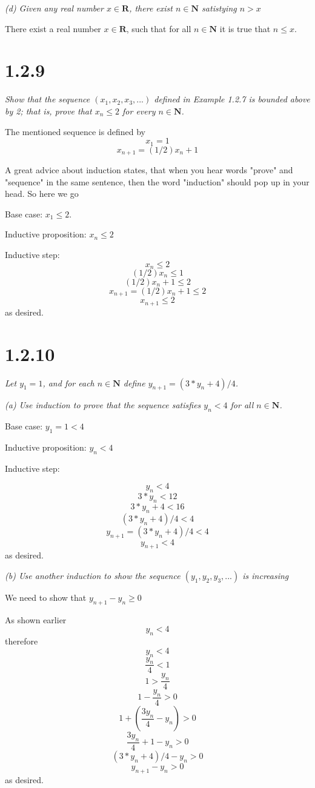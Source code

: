 \documentclass[11pt,oneside,titlepage]{article}
\begin{document}
\textit{(d) Given any real number $x \in \textbf{R}$, there exist $n \in
  \textbf{N}$ satistying $n > x$}

There exist a real number $x \in \textbf{R}$, such that for all $n \in \textbf{N}$ it is true that $n \leq x$.

\section*{1.2.9}
\textit{Show that the sequence $(x_1, x_2, x_3,...)$ defined in Example 1.2.7
  is bounded above by 2; that is, prove that $x_n \leq 2$ for every $n \in
  \textbf{N}$.}

The mentioned sequence is defined by
$$x_1 = 1$$
$$x_{n + 1} = (1/2)x_n + 1$$

A great advice about induction states, that when you hear words "prove" and
"sequence" in the same sentence, then the word "induction" should pop up in
your head. So here we go

Base case: $x_1 \leq 2$.

Inductive proposition: $x_n \leq 2$

Inductive step:
$$x_n \leq 2$$
$$(1/2)x_n \leq 1$$
$$(1/2)x_n + 1 \leq 2$$
$$x_{n + 1} = (1/2)x_n + 1 \leq 2$$
$$x_{n + 1} \leq 2$$
as desired.

\section*{1.2.10}
\textit{Let $y_1 = 1$, and for each $n \in \textbf{N}$ define $y_{n + 1} =
  (3 * y_n + 4) / 4$.}

\textit{(a) Use induction to prove that the sequence satisfies $y_n < 4$ for
  all $n \in \textbf{N}$.}

Base case: $y_1 = 1 < 4$

Inductive proposition: $y_n < 4$

Inductive step:

$$y_n < 4$$
$$3 * y_n < 12$$
$$3 * y_n + 4 < 16$$
$$(3 * y_n + 4) / 4 < 4$$
$$y_{n + 1} =  (3 * y_n + 4) / 4 < 4$$
$$y_{n + 1} < 4$$
as desired.

\textit{(b) Use another induction to show the sequence $(y_1, y_2, y_3,...)$
  is increasing}

We need to show that $y_{n + 1} - y_n \geq 0$

As shown earlier 
$$y_n < 4$$
therefore
$$ y_n < 4$$
$$ \frac{y_n}{4} < 1$$
$$1 > \frac{y_n}{4}$$
$$1 - \frac{y_n}{4} > 0$$
$$1 + (\frac{3 y_n}{4} - y_n) > 0$$
$$\frac{3 y_n}{4} + 1 - y_n > 0$$
$$(3 * y_n + 4) / 4 - y_n  > 0$$
$$y_{n + 1} - y_n  > 0$$
as desired.
\end{document}

